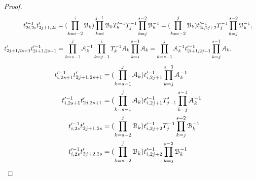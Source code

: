 \documentclass{amsart}
\begin{document}
\begin{proof}
\[\begin{aligned}
t'^{-1}_{2i,2s}t'_{2j+1,2s}&=(\prod^{i}_{k=s-2}\mathcal{B}_k)\prod^{j-1}_{k=i}\mathcal{B}_kT'^{-1}_kT^{-1}_j\prod^{s-2}_{k=j}\mathcal{B}^{-1}_k=(\prod^{j}_{k=s-2}\mathcal{B}_k)t'^{-1}_{2i,2j+2}T^{-1}_j\prod^{s-2}_{k=j}\mathcal{B}^{-1}_k,\\
t'_{2j+1,2s+1}t'^{-1}_{2i+1,2s+1}&=\prod^{j}_{k=s-1}\mathcal{A}^{-1}_k\prod^{i}_{k=j-1}T^{-1}_k\mathcal{A}_k\prod^{s-1}_{k=i}\mathcal{A}_k=\prod^{j}_{k=s-1}\mathcal{A}^{-1}_kt'^{-1}_{2i+1,2j+1}\prod^{s-1}_{k=j}\mathcal{A}_k.
\end{aligned}
\]
\fi
\begin{align*}
t'^{-1}_{i,2s+1}t'_{2j+1,2s+1}&=(\prod^{j}_{k=s-1}\mathcal{A}_k)t'^{-1}_{i,2j+1}\prod^{s-1}_{k=j}\mathcal{A}^{-1}_k\\ 
t'^{-1}_{i,2s+1}t'_{2j,2s+1}&=(\prod^{j}_{k=s-1}\mathcal{A}_k)t'^{-1}_{i,2j+1}T'_{j-1}\prod^{s-1}_{k=j}\mathcal{A}^{-1}_k\\ t'^{-1}_{i,2s}t'_{2j+1,2s}&=(\prod^{j}_{k=s-2}\mathcal{B}_k)t'^{-1}_{i,2j+2}T^{-1}_j\prod^{s-2}_{k=j}\mathcal{B}^{-1}_k\\ 
t'^{-1}_{i,2s}t'_{2j+2,2s}&=(\prod^{j}_{k=s-2}\mathcal{B}_k)t'^{-1}_{i,2j+2}\prod^{s-2}_{k=j}\mathcal{B}^{-1}_k 
\end{align*}


\end{proof}
\end{document}
